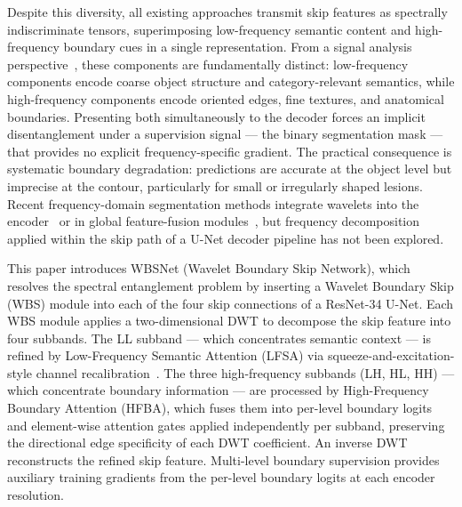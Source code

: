 \documentclass[journal]{IEEEtran}
\begin{document}
Despite this diversity, all existing approaches transmit skip features as
spectrally indiscriminate tensors, superimposing low-frequency semantic
content and high-frequency boundary cues in a single representation.
From a signal analysis perspective~\cite{mallat1989wavelet}, these components
are fundamentally distinct: low-frequency components encode coarse object
structure and category-relevant semantics, while high-frequency components
encode oriented edges, fine textures, and anatomical boundaries.
Presenting both simultaneously to the decoder forces an implicit
disentanglement under a supervision signal --- the binary segmentation mask ---
that provides no explicit frequency-specific gradient.
The practical consequence is systematic boundary degradation: predictions are
accurate at the object level but imprecise at the contour, particularly for
small or irregularly shaped lesions.
Recent frequency-domain segmentation methods integrate wavelets into the
encoder~\cite{wang2023wranet} or in global feature-fusion
modules~\cite{sffnet2024,easnet2025,li2024freqfusion}, but frequency
decomposition applied within the skip path of a U-Net decoder pipeline has not
been explored.

This paper introduces WBSNet (Wavelet Boundary Skip Network), which resolves
the spectral entanglement problem by inserting a Wavelet Boundary Skip (WBS)
module into each of the four skip connections of a ResNet-34 U-Net.
Each WBS module applies a two-dimensional DWT to decompose the skip feature
into four subbands.
The LL subband --- which concentrates semantic context --- is refined by
Low-Frequency Semantic Attention (LFSA) via squeeze-and-excitation-style
channel recalibration~\cite{hu2018senet}.
The three high-frequency subbands (LH, HL, HH) --- which concentrate boundary
information --- are processed by High-Frequency Boundary Attention (HFBA),
which fuses them into per-level boundary logits and element-wise attention
gates applied independently per subband, preserving the directional edge
specificity of each DWT coefficient.
An inverse DWT reconstructs the refined skip feature.
Multi-level boundary supervision provides auxiliary training gradients from the
per-level boundary logits at each encoder resolution.
\end{document}
